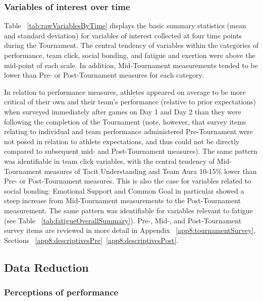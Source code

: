 \begin{CJK}{UTF8}{gbsn}
\subsubsection{Variables of interest over time}
Table ~\ref{tab:rawVariablesByTime} displays the basic summary statistics (mean and standard deviation) for variables of interest collected at four time points during the Tournament.  The central tendency of variables within the categories of performance, team click, social bonding, and fatigue and exertion were above the mid-point of each scale.  In addition, Mid-Tournament measurements tended to be lower than Pre- or Post-Tournament measures for each category.

In relation to performance measures, athletes appeared on average to be more critical of their own and their team’s performance (relative to prior expectations) when surveyed immediately after games on Day 1 and Day 2 than they were following the completion of the Tournament (note, however, that survey items relating to individual and team performance administered Pre-Tournament were not posed in relation to athlete expectations, and thus could not be directly compared to subsequent mid- and Post-Tournament measures).  The same pattern was identifiable in team click variables, with the central tendency of Mid-Tournament measures of Tacit Understanding and Team Aura 10-15\% lower than Pre- or Post-Tournament measures.  This is also the case for variables related to social bonding: Emotional Support and Common Goal in particular showed a steep increase from Mid-Tournament measurements to the Post-Tournament measurement.  The same pattern was identifiable for variables relevant to fatigue (see Table ~\ref{tab:fatigueOverallSummary}).
Pre-, Mid-, and Post-Tournament survey items are reviewed in more detail in Appendix ~\ref{app8:tournamentSurvey}, Sections ~\ref{app8:descriptivesPre}\nobreakdash~\ref{app8:descriptivesPost}.







\subsection{Data Reduction\label{Ch5:dataReduction}}


\subsubsection{Perceptions of performance}


\end{CJK}
